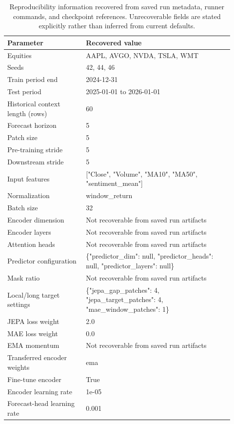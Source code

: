 \begin{table}[p]
\centering
\small
\caption{Reproducibility information recovered from saved run metadata, runner commands, and checkpoint references. Unrecoverable fields are stated explicitly rather than inferred from current defaults.}
\label{tab:reproducibility}
\begin{tabular}{p{0.32\linewidth}p{0.60\linewidth}}
\toprule
Parameter & Recovered value \\
\midrule
Equities & AAPL, AVGO, NVDA, TSLA, WMT \\
Seeds & 42, 44, 46 \\
Train period end & 2024-12-31 \\
Test period & 2025-01-01 to 2026-01-01 \\
Historical context length (rows) & 60 \\
Forecast horizon & 5 \\
Patch size & 5 \\
Pre-training stride & 5 \\
Downstream stride & 5 \\
Input features & ["Close", "Volume", "MA10", "MA50", "sentiment\_mean"] \\
Normalization & window\_return \\
Batch size & 32 \\
Encoder dimension & Not recoverable from saved run artifacts \\
Encoder layers & Not recoverable from saved run artifacts \\
Attention heads & Not recoverable from saved run artifacts \\
Predictor configuration & \{"predictor\_dim": null, "predictor\_heads": null, "predictor\_layers": null\} \\
Mask ratio & Not recoverable from saved run artifacts \\
Local/long target settings & \{"jepa\_gap\_patches": 4, "jepa\_target\_patches": 4, "mae\_window\_patches": 1\} \\
JEPA loss weight & 2.0 \\
MAE loss weight & 0.0 \\
EMA momentum & Not recoverable from saved run artifacts \\
Transferred encoder weights & ema \\
Fine-tune encoder & True \\
Encoder learning rate & 1e-05 \\
Forecast-head learning rate & 0.001 \\

\end{tabular}
\end{table}
